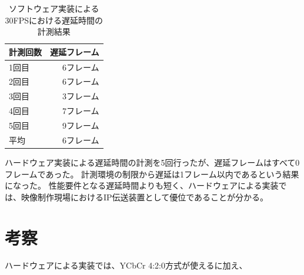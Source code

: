 \begin{table}[htbp]
  \caption{ソフトウェア実装による30FPSにおける遅延時間の計測結果}
  \label{tb:evaluate-software-delay}
  \begin{center}
  \begin{tabular}{l|r}
    \hline
     計測回数 & 遅延フレーム \\\hline\hline
     1回目 & 6フレーム   \\\hline
     2回目 & 6フレーム   \\\hline
     3回目 & 3フレーム   \\\hline
     4回目 & 7フレーム   \\\hline
     5回目 & 9フレーム   \\\hline\hline
      平均 & 6フレーム   \\\hline
  \end{tabular}\end{center}
\end{table}

ハードウェア実装による遅延時間の計測を5回行ったが、遅延フレームはすべて0フレームであった。
計測環境の制限から遅延は1フレーム以内であるという結果になった。
性能要件となる遅延時間よりも短く、ハードウェアによる実装では、映像制作現場におけるIP伝送装置として優位であることが分かる。


\section{考察}

ハードウェアによる実装では、YCbCr 4:2:0方式が使えるに加え、
